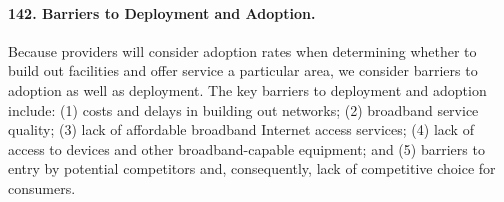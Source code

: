 \paragraph{142. Barriers to Deployment and Adoption. } Because providers will consider
adoption rates when determining whether to build out facilities and offer service 
a particular area, we consider barriers to adoption as well as deployment. The 
key barriers to deployment and adoption include: (1) costs and delays in building 
out networks; (2) broadband service quality; (3) lack of affordable broadband 
Internet access services; (4) lack of access to devices and other broadband-capable
equipment; and (5) barriers to entry by potential competitors and, consequently, 
lack of competitive choice for consumers.
